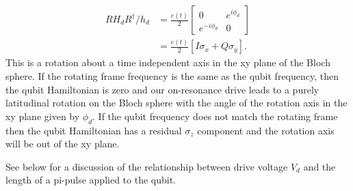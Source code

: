 \begin{align}
  RH_dR^{\dagger}/h_d
  &= \frac{e(t)}{2}
  \left[ \begin{array}{cc}
    0 & e^{i\phi_d} \\ e^{-i\phi_d} & 0
  \end{array} \right] \nonumber \\
  &= \frac{e(t)}{2} \left[ I \sigma_x + Q \sigma_y \right] .
\end{align}
This is a rotation about a time independent axis in the xy plane of the Bloch sphere.
If the rotating frame frequency is the same as the qubit frequency, then the qubit Hamiltonian is zero and our on-resonance drive leads to a purely latitudinal rotation on the Bloch sphere with the angle of the rotation axis in the xy plane given by $\phi_d$.
If the qubit frequency does not match the rotating frame then the qubit Hamiltonian has a residual $\sigma_z$ component and the rotation axis will be out of the xy plane.

See below for a discussion of the relationship between drive voltage $V_d$ and the length of a pi-pulse applied to the qubit.


